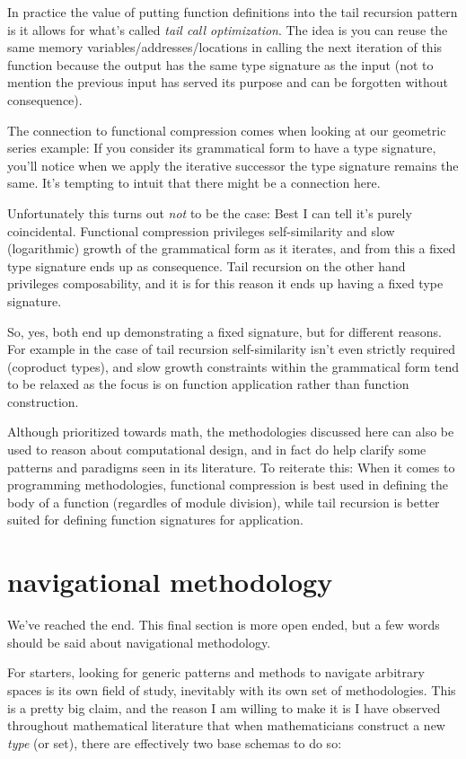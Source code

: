 \documentclass[twoside]{article}
\begin{document}
In practice the value of putting function definitions into the tail recursion pattern is it allows for what's called
\emph{tail call optimization}. The idea is you can reuse the same memory variables/addresses/locations in calling the
next iteration of this function because the output has the same type signature as the input (not to mention the previous
input has served its purpose and can be forgotten without consequence).

The connection to functional compression comes when looking at our geometric series example: If you consider its grammatical
form to have a type signature, you'll notice when we apply the iterative successor the type signature remains the same.
It's tempting to intuit that there might be a connection here.

Unfortunately this turns out \emph{not} to be the case: Best I can tell it's purely coincidental. Functional compression
privileges self-similarity and slow (logarithmic) growth of the grammatical form as it iterates, and from this a fixed type
signature ends up as consequence. Tail recursion on the other hand privileges composability, and it is for this reason it
ends up having a fixed type signature.

So, yes, both end up demonstrating a fixed signature, but for different reasons. For example in the case of tail
recursion self-similarity isn't even strictly required (coproduct types), and slow growth constraints within the
grammatical form tend to be relaxed as the focus is on function application rather than function construction.

Although prioritized towards math, the methodologies discussed here can also be used to reason about computational design,
and in fact do help clarify some patterns and paradigms seen in its literature. To reiterate this: When it comes to programming
methodologies, functional compression is best used in defining the body of a function (regardles of module division),
while tail recursion is better suited for defining function signatures for application.

\section*{navigational methodology}

We've reached the end. This final section is more open ended, but a few words should be said about navigational methodology.

For starters, looking for generic patterns and methods to navigate arbitrary spaces is its own field of study,
inevitably with its own set of methodologies. This is a pretty big claim, and the reason I am willing to make it
is I have observed throughout mathematical literature that when mathematicians construct a new \emph{type} (or set),
there are effectively two base schemas to do so:
\end{document}
